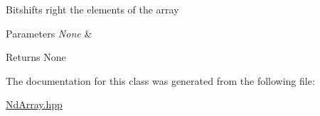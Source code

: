 Bitshifts right the elements of the array


\begin{DoxyParams}{Parameters}
{\em None} & \\
\hline
\end{DoxyParams}
\begin{DoxyReturn}{Returns}
None 
\end{DoxyReturn}


The documentation for this class was generated from the following file\+:\begin{DoxyCompactItemize}
\item 
\mbox{\hyperlink{_nd_array_8hpp}{Nd\+Array.\+hpp}}\end{DoxyCompactItemize}
